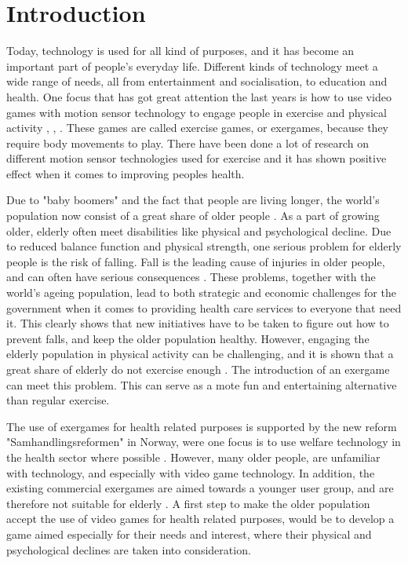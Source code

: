 \chapter{Introduction}

Today, technology is used for all kind of purposes, and it has become an important part of people's everyday life. Different kinds of technology meet a wide range of needs, all from entertainment and socialisation, to education and health. One focus that has got great attention the last years is how to use video games with motion sensor technology to engage people in exercise and physical activity \cite{exergamesforelderly}, \cite{gerling1}, \cite{garcia2012exergames}. These games are called exercise games, or exergames, because they require body movements to play. There have been done a lot of research on different motion sensor technologies used for exercise and it has shown positive effect when it comes to improving peoples health. 

Due to "baby boomers" and the fact that people are living longer, the world's population now consist of a great share of older people \cite{dickinson2007methods}. As a part of growing older, elderly often meet disabilities like physical and psychological decline. Due to reduced balance function and physical strength, one serious problem for elderly people is the risk of falling. Fall is the leading cause of injuries in older people, and can often have serious consequences  \cite{otago}. These problems, together with the world's ageing population, lead to both strategic and economic challenges for the government when it comes to providing health care services to everyone that need it. This clearly shows that new initiatives have to be taken to figure out how to prevent falls, and keep the older population healthy. However, engaging the elderly population in physical activity can be challenging, and it is shown that a great share of elderly do not exercise enough \cite{statistikknorge12}. The introduction of an exergame can meet this problem. This can serve as a mote fun and entertaining alternative than regular exercise.  

The use of exergames for health related purposes is supported by the new reform "Samhandlingsreformen" in Norway, were one focus is to use welfare technology in the health sector where possible \cite{welfare}. However, many older people, are unfamiliar with technology, and especially with video game technology. In addition, the existing commercial exergames are aimed towards a younger user group, and are therefore not suitable for elderly \cite{exergamesforelderly}. A first step to make the older population accept the use of video games for health related purposes, would be to develop a game aimed especially for their needs and interest, where their physical and psychological declines are taken into consideration. 

